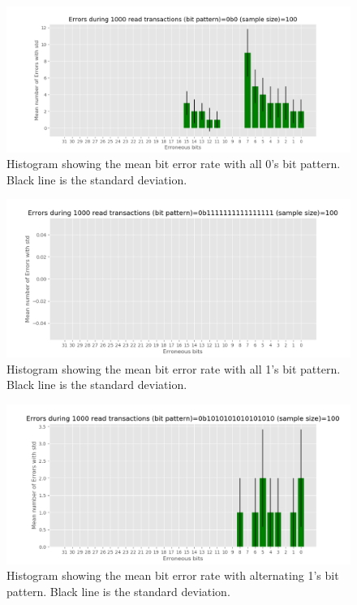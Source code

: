 \documentclass[main.tex]{subfiles}
\begin{document}
 


\begin{figure}[!ht]
    \centering
    \includegraphics[width=18cm]{images/error_rate_all_0s.png}
    \caption{Histogram showing the mean bit error rate with all 0's bit pattern. Black line is the standard deviation.}
    \label{fig: all_0_bit_rate}
\end{figure}
\FloatBarrier

\begin{figure}[!ht]
    \centering
    \includegraphics[width=18cm]{images/error_rate_all_1s.png}
    \caption{Histogram showing the mean bit error rate with all 1's bit pattern. Black line is the standard deviation.}
    \label{fig: all_1_bit_rate}
\end{figure}
\FloatBarrier

\begin{figure}[!ht]
    \centering
    \includegraphics[width=18cm]{images/error_rate_alternating_1s.png}
    \caption{Histogram showing the mean bit error rate with alternating 1's bit pattern. Black line is the standard deviation.}
    \label{fig: alternating_1_bit_rate}
\end{figure}
\FloatBarrier
\end{document}
